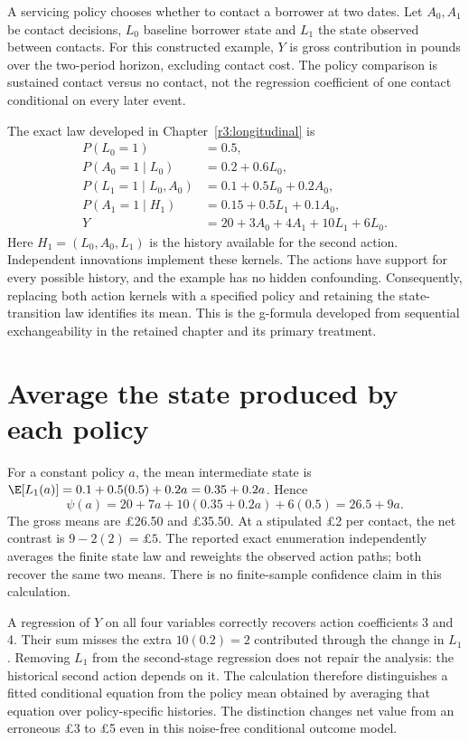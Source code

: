 A servicing policy chooses whether to contact a borrower at two dates. Let
$A_0,A_1$ be contact decisions, $L_0$ baseline borrower state and $L_1$ the
state observed between contacts. For this constructed example, $Y$ is
gross contribution in pounds over the two-period horizon, excluding contact
cost. The policy comparison is sustained contact versus no contact, not
the regression coefficient of one contact conditional on every later event.

The exact law developed in Chapter~\ref{r3:longitudinal} is
\begin{align*}
 P(L_0=1)&=0.5,\\
 P(A_0=1\mid L_0)&=0.2+0.6L_0,\\
 P(L_1=1\mid L_0,A_0)&=0.1+0.5L_0+0.2A_0,\\
 P(A_1=1\mid H_1)&=0.15+0.5L_1+0.1A_0,\\
 Y&=20+3A_0+4A_1+10L_1+6L_0.
\end{align*}
Here $H_1=(L_0,A_0,L_1)$ is the history available for the second action.
Independent innovations implement these kernels. The actions have support
for every possible history, and the example has no hidden confounding.
Consequently, replacing both action kernels with a specified policy and
retaining the state-transition law identifies its mean. This is the
g-formula developed from sequential exchangeability in the retained chapter
and its primary treatment. \citep[Chapter 21]{hernan2020}

\section{Average the state produced by each policy}
For a constant policy $a$, the mean intermediate state is
$\E[L_1(a)]=0.1+0.5(0.5)+0.2a=0.35+0.2a$. Hence
\[
 \psi(a)=20+7a+10(0.35+0.2a)+6(0.5)=26.5+9a.
\]
The gross means are \pounds26.50 and \pounds35.50. At a stipulated
\pounds2 per contact, the net contrast is $9-2(2)=\pounds5$.
The reported exact enumeration independently averages the finite state law
and reweights the observed action paths; both recover the same two means.
There is no finite-sample confidence claim in this calculation.

A regression of $Y$ on all four variables correctly recovers action
coefficients 3 and 4. Their sum misses the extra $10(0.2)=2$ contributed
through the change in $L_1$. Removing $L_1$ from the second-stage regression
does not repair the analysis: the historical second action depends on it.
The calculation therefore distinguishes a fitted conditional equation from
the policy mean obtained by averaging that equation over policy-specific
histories. The distinction changes net value from an erroneous \pounds3
to \pounds5 even in this noise-free conditional outcome model.

